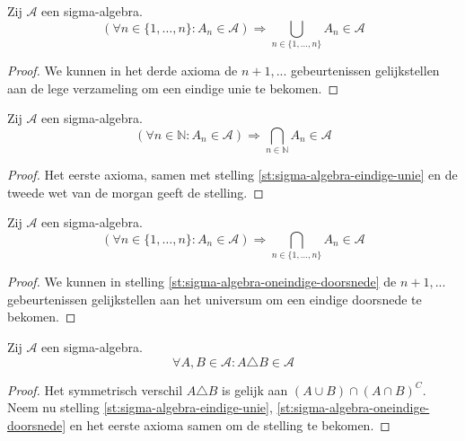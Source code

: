 \documentclass[main.tex]{subfiles}
\begin{document}
\begin{st}
  \label{st:sigma-algebra-eindige-unie}
  Zij $\mathcal{A}$ een sigma-algebra.
  \[ (\forall n\in \{ 1,\dotsc,n \}: A_{n} \in \mathcal{A}) \Rightarrow \bigcup_{n\in \{1,\dotsc,n\}}A_{n} \in \mathcal{A} \]

  \begin{proof}
    We kunnen in het derde axioma de $n+1,...$ gebeurtenissen gelijkstellen aan de lege verzameling om een eindige unie te bekomen.
  \end{proof}
\end{st}

\begin{st}
  \label{st:sigma-algebra-oneindige-doorsnede}
  Zij $\mathcal{A}$ een sigma-algebra.
  \[ (\forall n\in \mathbb{N}: A_{n} \in \mathcal{A}) \Rightarrow \bigcap_{n\in \mathbb{N}}A_{n} \in \mathcal{A} \]

  \begin{proof}
    Het eerste axioma, samen met stelling \ref{st:sigma-algebra-eindige-unie} en de tweede wet van de morgan geeft de stelling.
  \end{proof}
\end{st}

\begin{st}
  Zij $\mathcal{A}$ een sigma-algebra.
  \[ (\forall n\in \{ 1,\dotsc,n \}: A_{n} \in \mathcal{A}) \Rightarrow \bigcap_{n\in \{1,\dotsc,n\}}A_{n} \in \mathcal{A} \]

  \begin{proof}
    We kunnen in stelling \ref{st:sigma-algebra-oneindige-doorsnede} de $n+1,...$ gebeurtenissen gelijkstellen aan het universum om een eindige doorsnede te bekomen.
  \end{proof}
\end{st}

\begin{st}
  Zij $\mathcal{A}$ een sigma-algebra.
  \[ \forall A,B \in \mathcal{A}: A \triangle B \in \mathcal{A} \]

  \begin{proof}
    Het symmetrisch verschil $A \triangle B$ is gelijk aan $(A\cup B) \cap (A \cap B)^{C}$. 
    Neem nu stelling \ref{st:sigma-algebra-eindige-unie}, \ref{st:sigma-algebra-oneindige-doorsnede} en het eerste axioma samen om de stelling te bekomen.
  \end{proof}
\end{st}
\end{document}
